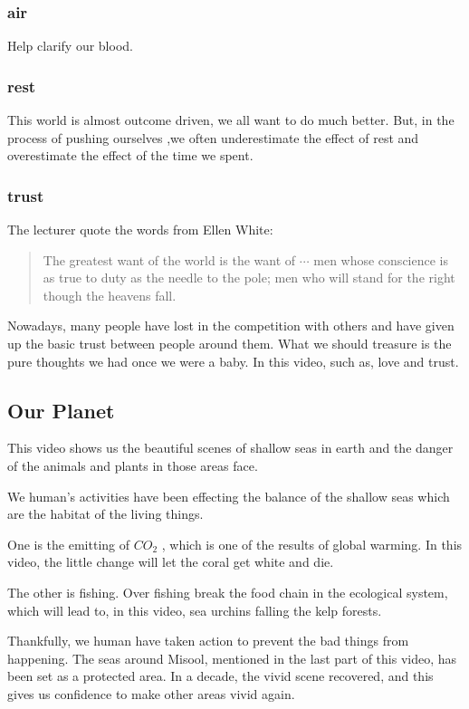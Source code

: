 \documentclass{article}
\begin{document}
\subsubsection*{air}

Help clarify our blood.

\subsubsection*{rest}

This world is almost outcome driven, we all want to do much better. But, in the process of pushing ourselves ,we often underestimate the effect of rest and overestimate the effect of the time we spent.

\subsubsection*{trust}
The lecturer quote the words from Ellen White:
\begin{quote}
    The greatest want of the world is the want of $\cdots$ men whose conscience is as true to duty as the needle to the pole; men who will stand for the right though the heavens fall.
\end{quote}
Nowadays, many people have lost in the competition with others and  have given up the basic trust between people around them.
What we should treasure is the pure thoughts we had once we were a baby. In this video, such as, love and trust.

\subsection{Our Planet}
This video shows us the beautiful scenes of shallow seas in earth and the danger of the animals and plants in those areas face.

We human's activities have been effecting the balance of the shallow seas which are the habitat of the living things. 

One is the emitting of $CO_2$ , which is one of the results of global warming. In this video, the little change will let the coral get white and die.

The other is fishing. Over fishing break the food chain in the ecological system, which will lead to, in this video, sea urchins falling the kelp forests.

Thankfully, we human have taken action to prevent the bad things from happening. The seas around Misool, mentioned in the last part of this video, has been set as a protected area. In a decade, the vivid scene recovered, and this gives us confidence to make other areas vivid again.
\end{document}
